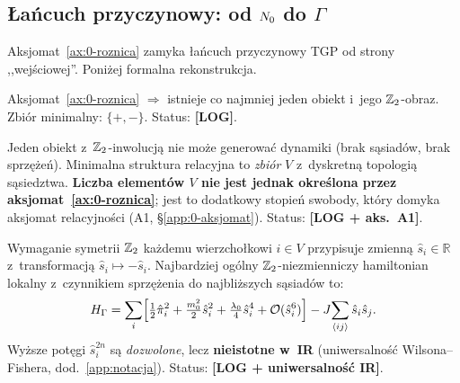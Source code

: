 \subsection{\L{}a\'ncuch przyczynowy: od $N_0$ do $\Gamma$}%
\label{app:0-lancuch}

Aksjomat~\ref{ax:0-roznica} zamyka \l{}a\'ncuch przyczynowy TGP
od strony ,,wej\'sciowej''. Poni\.zej formalna rekonstrukcja.

\begin{chain}%
\label{chain:0-krok1}
Aksjomat~\ref{ax:0-roznica} $\Rightarrow$
istnieje co najmniej jeden obiekt i~jego $\mathbb{Z}_2$-obraz.
Zbi\'or minimalny: $\{+, -\}$. Status: \textbf{[LOG]}.
\end{chain}

\begin{chain}%
\label{chain:0-krok2}
Jeden obiekt z~$\mathbb{Z}_2$-inwolucj\k{a} nie mo\.ze generowa\'c dynamiki
(brak s\k{a}siad\'ow, brak sprz\k{e}\.ze\'n). Minimalna struktura
relacyjna to \emph{zbi\'or} $V$ z~dyskretn\k{a} topologi\k{a}
s\k{a}siedztwa. \textbf{Liczba element\'ow $V$ nie jest jednak
okre\'slona przez aksjomat~\ref{ax:0-roznica}}; jest to dodatkowy
stopień swobody, kt\'ory domyka aksjomat relacyjno\'sci
(A1, \S\ref{app:0-aksjomat}). Status: \textbf{[LOG + aks.~A1]}.
\end{chain}

\begin{chain}%
\label{chain:0-krok3}
Wymaganie symetrii $\mathbb{Z}_2$ ka\.zdemu wierzcho\l{}kowi $i \in V$ przypisuje
zmienn\k{a} $\hat{s}_i \in \mathbb{R}$ z~transformacj\k{a}
$\hat{s}_i \mapsto -\hat{s}_i$.
Najbardziej og\'olny $\mathbb{Z}_2$-niezmienniczy hamiltonian lokalny z~czynnikiem
sprz\k{e}\.zenia do najbli\.zszych s\k{a}siad\'ow to:
\begin{equation}\label{eq:0-H-general}
  H_\Gamma = \sum_i \Bigl[
    \tfrac{1}{2}\hat{\pi}_i^2
    + \tfrac{m_0^2}{2}\hat{s}_i^2
    + \tfrac{\lambda_0}{4}\hat{s}_i^4
    + \mathcal{O}(\hat{s}_i^6)
  \Bigr]
  - J\!\sum_{\langle ij\rangle} \hat{s}_i\hat{s}_j.
\end{equation}
Wy\.zsze pot\k{e}gi $\hat{s}_i^{2n}$ s\k{a} \emph{dozwolone}, lecz
\textbf{nieistotne w~IR} (uniwersalno\'s\'c Wilsona--Fishera,
dod.~\ref{app:notacja}). Status: \textbf{[LOG + uniwersalno\'s\'c IR]}.
\end{chain}

